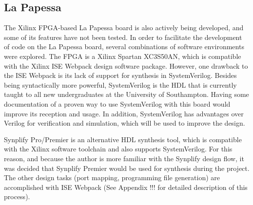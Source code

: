 	\subsection{La Papessa} %
	\label{sub:la_papessa_env}
		The Xilinx FPGA-based La Papessa board is also actively being developed, and some of its features have not been tested.  In order to facilitate the development of code on the La Papessa board, several combinations of software environments were explored.  The FPGA is a Xilinx Spartan XC3S50AN, which is compatible with the Xilinx ISE Webpack design software package.  However, one drawback to the ISE Webpack is its lack of support for synthesis in SystemVerilog. Besides being syntactically more powerful, SystemVerilog is the HDL that is currently taught to all new undergraduates at the University of Southampton. Having some documentation of a proven way to use SystemVerilog with this board would improve its reception and usage. In addition, SystemVerilog has advantages over Verilog for verification and simulation, which will be used to improve the design.

		Synplify Pro/Premier is an alternative HDL synthesis tool, which is compatible with the Xilinx software toolchain and also supports SystemVerilog. For this reason, and because the author is more familiar with the Synplify design flow, it was decided that Synplify Premier would be used for synthesis during the project.  The other design tasks (port mapping, programming file generation) are accomplished with ISE Webpack (See Appendix !!! for detailed description of this process).



